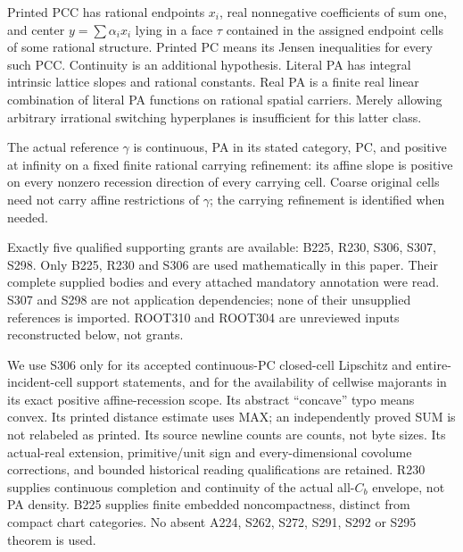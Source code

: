 \documentclass[11pt]{article}
\begin{document}
Printed PCC has rational endpoints $x_i$, real nonnegative coefficients of sum one, and center $y=\sum\alpha_i x_i$ lying in a face $\tau$ contained in the assigned endpoint cells of some rational structure. Printed PC means its Jensen inequalities for every such PCC. Continuity is an additional hypothesis. Literal PA has integral intrinsic lattice slopes and rational constants. Real PA is a finite real linear combination of literal PA functions on rational spatial carriers. Merely allowing arbitrary irrational switching hyperplanes is insufficient for this latter class.

The actual reference $\gamma$ is continuous, PA in its stated category, PC, and positive at infinity on a fixed finite rational carrying refinement: its affine slope is positive on every nonzero recession direction of every carrying cell. Coarse original cells need not carry affine restrictions of $\gamma$; the carrying refinement is identified when needed.

Exactly five qualified supporting grants are available: B225, R230, S306, S307, S298. Only B225, R230 and S306 are used mathematically in this paper. Their complete supplied bodies and every attached mandatory annotation were read. S307 and S298 are not application dependencies; none of their unsupplied references is imported. ROOT310 and ROOT304 are unreviewed inputs reconstructed below, not grants.

We use S306 only for its accepted continuous-PC closed-cell Lipschitz and entire-incident-cell support statements, and for the availability of cellwise majorants in its exact positive affine-recession scope. Its abstract ``concave'' typo means convex. Its printed distance estimate uses MAX; an independently proved SUM is not relabeled as printed. Its source newline counts are counts, not byte sizes. Its actual-real extension, primitive/unit sign and every-dimensional covolume corrections, and bounded historical reading qualifications are retained. R230 supplies continuous completion and continuity of the actual all-$C_b$ envelope, not PA density. B225 supplies finite embedded noncompactness, distinct from compact chart categories. No absent A224, S262, S272, S291, S292 or S295 theorem is used.
\end{document}

